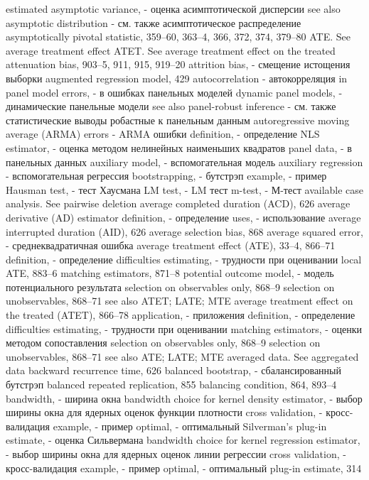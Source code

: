 estimated asymptotic variance,  - оценка асимптотической дисперсии
see also asymptotic distribution - см. также асимптотическое распределение
asymptotically pivotal statistic, 359–60, 363–4, 366, 372, 374, 379–80
ATE. See average treatment effect
ATET. See average treatment effect on the treated attenuation bias, 903–5, 911, 915, 919–20 attrition bias, - смещение истощения выборки
augmented regression model, 429
autocorrelation - автокорреляция
in panel model errors, - в ошибках панельных моделей 
dynamic panel models, - динамические панельные модели
see also panel-robust inference - см. также статистические выводы робастные к панельным данным
autoregressive moving average (ARMA) errors - ARMA ошибки
definition, - определение
NLS estimator, - оценка методом нелинейных наименьших квадратов
panel data, - в панельных данных
auxiliary model, - вспомогательная модель 
auxiliary regression - вспомогательная регрессия 
bootstrapping, - бутстрэп 
example, - пример 
Hausman test, - тест Хаусмана
LM test, - LM тест 
m-test, - М-тест
available case analysis. See pairwise deletion average completed duration (ACD), 626 average derivative (AD) estimator
definition, - определение
uses, - использование
average interrupted duration (AID), 626 average selection bias, 868
average squared error, - среднеквадратичная ошибка
average treatment effect (ATE), 33–4, 866–71
definition, - определение
difficulties estimating, - трудности при оценивании
local ATE, 883–6
matching estimators, 871–8 
potential outcome model, - модель потенциального результата
selection on observables only, 868–9 selection on unobservables, 868–71 
see also ATET; LATE; MTE
average treatment effect on the treated (ATET), 866–78
application, - приложения
definition, - определение
difficulties estimating, - трудности при оценивании
matching estimators, - оценки методом сопоставления 
selection on observables only, 868–9 selection on unobservables, 868–71 
see also ATE; LATE; MTE
averaged data. See aggregated data
backward recurrence time, 626
balanced bootstrap, - сбалансированный бутстрэп
balanced repeated replication, 855
balancing condition, 864, 893–4
bandwidth, - ширина окна
bandwidth choice for kernel density estimator, - выбор ширины окна для ядерных оценок функции плотности
cross validation, - кросс-валидация
example, - пример
optimal, - оптимальный
Silverman’s plug-in estimate, - оценка Сильвермана
bandwidth choice for kernel regression estimator, - выбор ширины окна для ядерных оценок линии регрессии
cross validation, - кросс-валидация 
example, - пример 
optimal, - оптимальный 
plug-in estimate, 314
